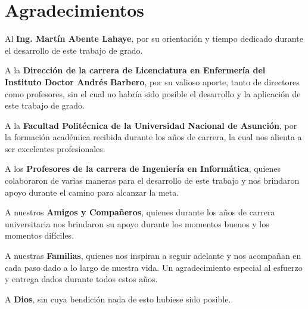 \chapter*{Agradecimientos}

Al \textbf{Ing. Martín Abente Lahaye}, por su orientación  y tiempo dedicado
durante el desarrollo de este trabajo de grado.

A la \textbf{Dirección de la carrera de Licenciatura en Enfermería del Instituto
    Doctor Andrés Barbero}, por su valioso aporte, tanto de directores como
profesores, sin el cual no habría sido posible el desarrollo y la aplicación de
este trabajo de grado.
 

A la \textbf{Facultad Politécnica de la Universidad Nacional de Asunción}, por
la formación académica recibida durante los años de carrera, la cual nos alienta
a ser excelentes profesionales.

A los \textbf{Profesores de la carrera de Ingeniería en Informática}, quienes
colaboraron de varias maneras para el desarrollo de este trabajo y nos brindaron
apoyo durante el camino para alcanzar la meta.

A nuestros \textbf{Amigos y Compañeros}, quienes durante los años de carrera
universitaria nos brindaron su apoyo durante los momentos buenos y los momentos
difíciles.

A nuestras \textbf{Familias}, quienes nos inspiran a seguir adelante y nos
acompañan en cada paso dado a lo largo de nuestra vida. Un agradecimiento
especial al esfuerzo y entrega dados durante todos estos años.

A \textbf{Dios}, sin cuya bendición nada de esto hubiese sido posible.
